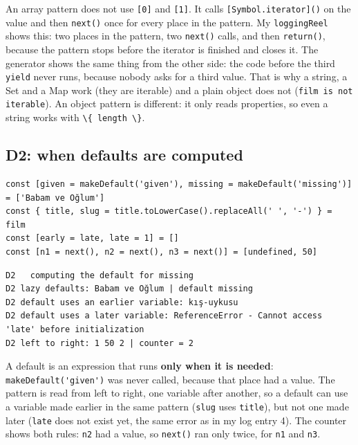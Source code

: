 \documentclass[
]{article}
\newcommand{\passthrough}[1]{#1}
\begin{document}
An array pattern does not use \passthrough{\lstinline![0]!} and
\passthrough{\lstinline![1]!}. It calls
\passthrough{\lstinline![Symbol.iterator]()!} on the value and then
\passthrough{\lstinline!next()!} once for every place in the pattern. My
\passthrough{\lstinline!loggingReel!} shows this: two places in the
pattern, two \passthrough{\lstinline!next()!} calls, and then
\passthrough{\lstinline!return()!}, because the pattern stops before the
iterator is finished and closes it. The generator shows the same thing
from the other side: the code before the third
\passthrough{\lstinline!yield!} never runs, because nobody asks for a
third value. That is why a string, a Set and a Map work (they are
iterable) and a plain object does not
(\passthrough{\lstinline!film is not iterable!}). An object pattern is
different: it only reads properties, so even a string works with
\passthrough{\lstinline!\{ length \}!}.

\hypertarget{d2-when-defaults-are-computed}{%
\subsection{D2: when defaults are
computed}\label{d2-when-defaults-are-computed}}

\begin{lstlisting}
const [given = makeDefault('given'), missing = makeDefault('missing')] = ['Babam ve Oğlum']
const { title, slug = title.toLowerCase().replaceAll(' ', '-') } = film
const [early = late, late = 1] = []
const [n1 = next(), n2 = next(), n3 = next()] = [undefined, 50]
\end{lstlisting}

\begin{lstlisting}
D2   computing the default for missing
D2 lazy defaults: Babam ve Oğlum | default missing
D2 default uses an earlier variable: kış-uykusu
D2 default uses a later variable: ReferenceError - Cannot access 'late' before initialization
D2 left to right: 1 50 2 | counter = 2
\end{lstlisting}

A default is an expression that runs \textbf{only when it is needed}:
\passthrough{\lstinline!makeDefault('given')!} was never called, because
that place had a value. The pattern is read from left to right, one
variable after another, so a default can use a variable made earlier in
the same pattern (\passthrough{\lstinline!slug!} uses
\passthrough{\lstinline!title!}), but not one made later
(\passthrough{\lstinline!late!} does not exist yet, the same error as in
my log entry 4). The counter shows both rules:
\passthrough{\lstinline!n2!} had a value, so
\passthrough{\lstinline!next()!} ran only twice, for
\passthrough{\lstinline!n1!} and \passthrough{\lstinline!n3!}.
\end{document}
